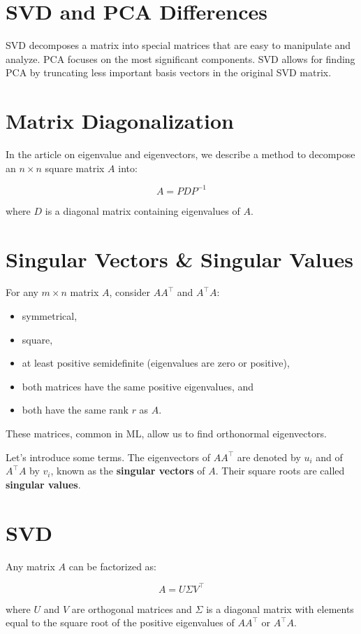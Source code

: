 \documentclass{ximera}
\begin{document}
\section{SVD and PCA Differences}
SVD decomposes a matrix into special matrices that are easy to manipulate and analyze. PCA focuses on the most significant components. SVD allows for finding PCA by truncating less important basis vectors in the original SVD matrix.

\section{Matrix Diagonalization}
In the article on eigenvalue and eigenvectors, we describe a method to decompose an \(n \times n\) square matrix \(A\) into:

\[
A = PDP^{-1}
\]

where \(D\) is a diagonal matrix containing eigenvalues of \(A\).

\section{Singular Vectors \& Singular Values}
For any \(m \times n\) matrix \(A\), consider \(AA^\top\) and \(A^\top A\):

\begin{itemize}
    \item symmetrical,
    \item square,
    \item at least positive semidefinite (eigenvalues are zero or positive),
    \item both matrices have the same positive eigenvalues, and
    \item both have the same rank \(r\) as \(A\).
\end{itemize}

These matrices, common in ML, allow us to find orthonormal eigenvectors.

Let’s introduce some terms. The eigenvectors of \(AA^\top\) are denoted by \(u_i\) and of \(A^\top A\) by \(v_i\), known as the \textbf{singular vectors} of \(A\). Their square roots are called \textbf{singular values}.

\section{SVD}
Any matrix \(A\) can be factorized as:

\[
A = U \Sigma V^\top
\]

where \(U\) and \(V\) are orthogonal matrices and \(\Sigma\) is a diagonal matrix with elements equal to the square root of the positive eigenvalues of \(AA^\top\) or \(A^\top A\).
\end{document}
